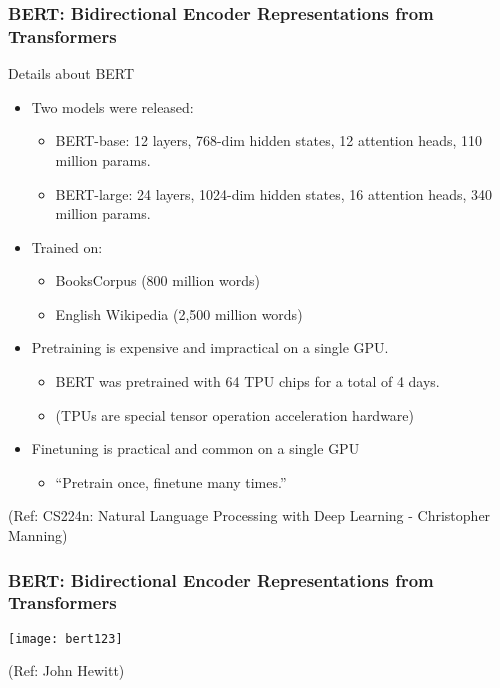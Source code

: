 \begin{frame}[fragile]\frametitle{BERT: Bidirectional Encoder Representations from Transformers}

Details about BERT


      \begin{itemize}
			\item Two models were released:
			      \begin{itemize}
						\item BERT-base: 12 layers, 768-dim hidden states, 12 attention heads, 110 million params.
						\item BERT-large: 24 layers, 1024-dim hidden states, 16 attention heads, 340 million params.
						\end{itemize}

			\item Trained on:
			      \begin{itemize}
						\item BooksCorpus (800 million words)
						\item English Wikipedia (2,500 million words)
						\end{itemize}

			\item Pretraining is expensive and impractical on a single GPU.
			      \begin{itemize}
						\item BERT was pretrained with 64 TPU chips for a total of 4 days.
						\item (TPUs are special tensor operation acceleration hardware)
						\end{itemize}

			\item Finetuning is practical and common on a single GPU
			      \begin{itemize}
						\item ``Pretrain once, finetune many times.''
						\end{itemize}

			\end{itemize}
			
{\tiny (Ref: CS224n: Natural Language Processing with Deep Learning - Christopher Manning)}

\end{frame}

\begin{frame}[fragile]\frametitle{BERT: Bidirectional Encoder Representations from Transformers}

			\begin{center}
			\texttt{[image: bert123]}
			\end{center}		
			
			{\tiny (Ref: John Hewitt)}

\end{frame}

